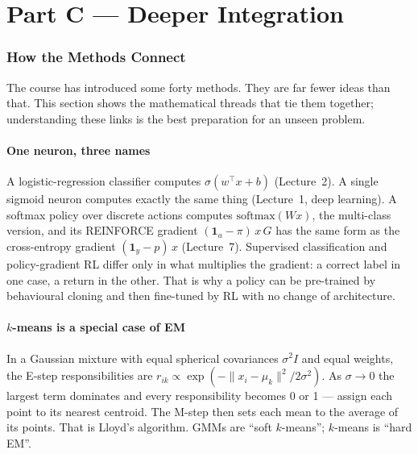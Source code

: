 \documentclass[11pt]{article}
\begin{document}
\clearpage
\part*{Part C --- Deeper Integration}

\section{How the Methods Connect}
The course has introduced some forty methods. They are far fewer ideas than that. This section shows the mathematical threads that tie them together; understanding these links is the best preparation for an unseen problem.

\subsection{One neuron, three names}
A logistic-regression classifier computes $\sigma(w^\top x+b)$ (Lecture~2). A single sigmoid neuron computes exactly the same thing (Lecture~1, deep learning). A softmax policy over discrete actions computes $\text{softmax}(Wx)$, the multi-class version, and its REINFORCE gradient $(\mathbf 1_a-\pi)\,x\,G$ has the same form as the cross-entropy gradient $(\mathbf 1_y-p)\,x$ (Lecture~7). Supervised classification and policy-gradient RL differ only in what multiplies the gradient: a correct label in one case, a return in the other. That is why a policy can be pre-trained by behavioural cloning and then fine-tuned by RL with no change of architecture.

\subsection{$k$-means is a special case of EM}
In a Gaussian mixture with equal spherical covariances $\sigma^2I$ and equal weights, the E-step responsibilities are $r_{ik}\propto\exp(-\|x_i-\mu_k\|^2/2\sigma^2)$. As $\sigma\to0$ the largest term dominates and every responsibility becomes 0 or 1 --- assign each point to its nearest centroid. The M-step then sets each mean to the average of its points. That is Lloyd's algorithm. GMMs are ``soft $k$-means''; $k$-means is ``hard EM''.
\end{document}
